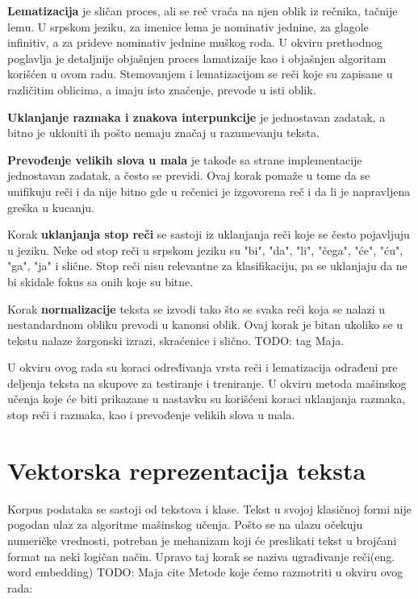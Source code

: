 \documentclass[12pt,oneside]{memoir}
\begin{document}
\textbf{Lematizacija} je sličan proces, ali se reč vraća na njen oblik iz rečnika, tačnije lemu. U srpskom jeziku, za imenice lema je nominativ jednine,  za glagole infinitiv, a za prideve nominativ jednine muškog roda. U okviru prethodnog poglavlja je detaljnije objašnjen proces lamatizaije kao i objašnjen algoritam korišćen u ovom radu. Stemovanjem i lematizacijom se reči koje su zapisane u različitim oblicima, a imaju isto značenje, prevode u isti oblik.

\textbf{Uklanjanje razmaka i znakova interpunkcije} je jednostavan zadatak, a bitno je ukloniti ih pošto nemaju značaj u razumevanju teksta.
 
\textbf{Prevođenje velikih slova u mala} je takođe sa strane implementacije jednostavan zadatak, a često se previdi. Ovaj korak pomaže u tome da se unifikuju reči i da nije bitno gde u rečenici je izgovorena reč i da li je napravljena greška u kucanju.

Korak \textbf{uklanjanja stop reči} se sastoji iz uklanjanja reči koje se često pojavljuju u jeziku. Neke od stop reči u srpskom jeziku su "bi", "da", "li", "čega", "će", "ću", "ga", "ja" i slične. Stop reči nisu relevantne za klasifikaciju, pa se uklanjaju da ne bi skidale fokus sa onih koje su bitne.

Korak \textbf{normalizacije} teksta se izvodi tako što se svaka reči koja se nalazi u nestandardnom obliku prevodi u kanonsi oblik. Ovaj korak je bitan ukoliko se u tekstu nalaze žargonski izrazi, skraćenice i slično. TODO: tag Maja.

U okviru ovog rada su koraci određivanja vrsta reči i lematizacija odrađeni pre deljenja teksta na skupove za testiranje i treniranje. U okviru metoda mašinskog učenja koje će biti prikazane u nastavku su korišćeni koraci uklanjanja razmaka, stop reči i razmaka, kao i prevođenje velikih slova u mala.


\section{Vektorska reprezentacija teksta}

Korpus podataka se sastoji od tekstova i klase.  Tekst u svojoj klasičnoj formi nije pogodan ulaz za algoritme mašinskog učenja.  Pošto se na ulazu očekuju numeričke vrednosti,  potreban je mehanizam koji će preslikati tekst u brojčani format na neki logičan način.  Upravo taj korak se naziva ugrađivanje reči(eng.  word embedding) TODO:  Maja cite 
Metode koje ćemo razmotriti u okviru ovog rada:
\end{document}
